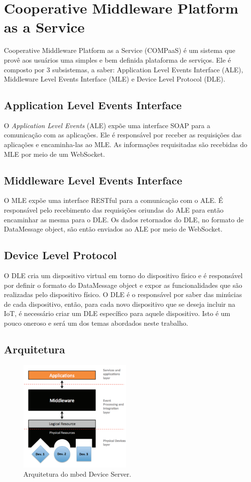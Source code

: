 \section{Cooperative Middleware Platform as a Service}
\label{sec:COMPaaS}
Cooperative Middleware Platform as a Service (COMPaaS) é um sistema que provê aos usuários uma simples e bem
definida plataforma de serviços. Ele é composto por 3 subsistemas, a saber:  Application Level Events
Interface (ALE), Middleware Level Events Interface (MLE) e Device Level Protocol (DLE).

\subsection{Application Level Events Interface}
O \textit{Application Level Events} (ALE) expõe uma interface SOAP para a comunicação com as aplicações.
Ele é responsável por receber as requisições das aplicações e encaminha-las ao MLE. As informações
requisitadas são recebidas do MLE por meio de um WebSocket.

\subsection{Middleware Level Events Interface}
O MLE expõe uma interface RESTful para a comunicação com o ALE. É responsável pelo recebimento das requisições
oriundas do ALE para então encaminhar as mesma para o DLE. Os dados retornados do DLE, no formato de DataMessage
object, são então enviados ao ALE por meio de WebSocket.

\subsection{Device Level Protocol}
O DLE cria um dispositivo virtual em torno do dispositivo físico e é responsável por definir o formato do DataMessage
object e expor as funcionalidades que são realizadas pelo dispositivo físico. O DLE é o responsável por saber das
minúcias de cada dispositivo, então, para cada novo dispositivo que se deseja incluir na IoT, é necessário criar
um DLE específico para aquele dispositivo. Isto é um pouco oneroso e será um dos temas abordados neste trabalho.

\subsection{Arquitetura}
\begin{figure}[H]
	\centering
		\includegraphics[width=0.5\textwidth]{fig/compaas_arch.png}
	\caption{Arquitetura do mbed Device Server.}
\end{figure}

